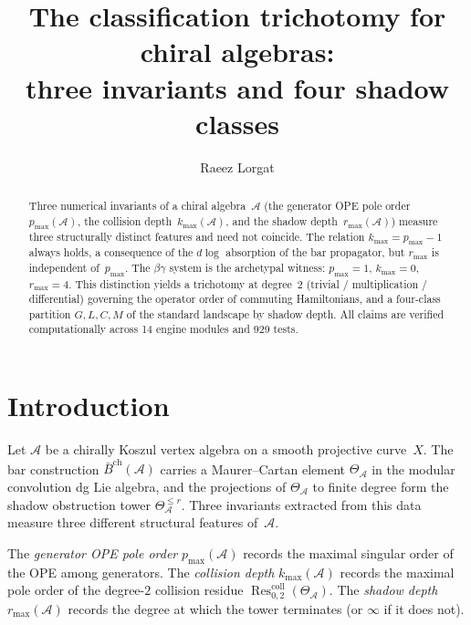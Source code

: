 \documentclass[11pt]{article}
\theoremstyle{definition}
\theoremstyle{remark}
\newcommand{\cA}{\mathcal{A}}
\newcommand{\barB}{\bar{B}}
\newcommand{\Res}{\operatorname{Res}}
\numberwithin{equation}{section}
\begin{document}
\title{The classification trichotomy for chiral algebras:\\
three invariants and four shadow classes}

\author{Raeez Lorgat}
\date{}

\maketitle

\begin{abstract}
Three numerical invariants of a chiral algebra~$\cA$ (the generator
OPE pole order~$p_{\max}(\cA)$, the collision depth~$k_{\max}(\cA)$,
and the shadow depth~$r_{\max}(\cA)$) measure three structurally
distinct features and need not coincide. The relation
$k_{\max} = p_{\max} - 1$ always holds, a consequence of the
$d\log$ absorption of the bar propagator, but $r_{\max}$ is independent
of~$p_{\max}$. The $\beta\gamma$ system is the archetypal witness:
$p_{\max} = 1$, $k_{\max} = 0$, $r_{\max} = 4$. This distinction
yields a trichotomy at degree~$2$ (trivial / multiplication /
differential) governing the operator order of commuting Hamiltonians,
and a four-class partition $G,L,C,M$ of the standard landscape by
shadow depth. All claims are verified computationally across 14 engine
modules and 929 tests.
\end{abstract}

\section{Introduction}\label{sec:intro}

Let $\cA$ be a chirally Koszul vertex algebra on a smooth projective
curve~$X$. The bar construction $\barB^{\mathrm{ch}}(\cA)$ carries a
Maurer--Cartan element $\Theta_\cA$ in the modular convolution dg Lie
algebra, and the projections of $\Theta_\cA$ to finite degree form the
shadow obstruction tower $\Theta_\cA^{\leq r}$. Three invariants
extracted from this data measure three different structural features
of~$\cA$.

The \emph{generator OPE pole order} $p_{\max}(\cA)$ records the
maximal singular order of the OPE among generators. The \emph{collision
depth} $k_{\max}(\cA)$ records the maximal pole order of the degree-$2$
collision residue $\Res^{\mathrm{coll}}_{0,2}(\Theta_\cA)$. The
\emph{shadow depth} $r_{\max}(\cA)$ records the degree at which the tower
terminates (or $\infty$ if it does not).
\end{document}

